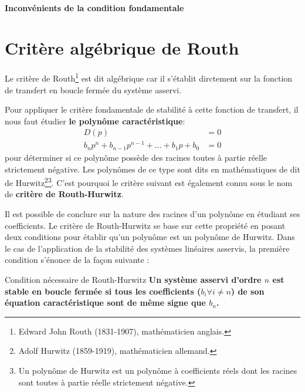 \paragraph{Inconvénients de la condition fondamentale}

\section{Critère algébrique de Routh}

Le critère de Routh\footnote{Edward John Routh (1831-1907), mathématicien anglais.}
est dit algébrique car il s'établit dirctement sur la fonction de transfert en 
boucle fermée du système asservi. 

Pour appliquer le critère fondamentale de stabilité à cette fonction de transfert,
il nous faut étudier \textbf{le polynôme caractéristique}:
\begin{align}
    D(p)&=0 \nonumber\\
    b_np^n+b_{n-1}p^{n-1}+\ldots+b_1p+b_0 &= 0
\end{align}
pour déterminer si ce polynôme possède des racines toutes à partie réelle 
strictement négative. Les polynômes de ce type sont dits en mathématiques 
de dit de Hurwitz\footnote{Adolf Hurwitz (1859-1919), mathématicien allemand.}\footnote{Un polynôme de 
Hurwitz est un polynôme à coefficients 
réels dont les racines sont toutes à partie réelle strictement négative.}.
C'est pourquoi le critère suivant est également connu sous le nom de \textbf{critère de Routh-Hurwitz}.

Il est possible de conclure sur la nature des racines d'un polynôme 
en étudiant ses coefficients. Le critère de Routh-Hurwitz se base sur cette propriété en 
posant deux conditions pour établir qu'un polynôme est un polynôme de Hurwitz.
Dans le cas de l'application de la stabilité des systèmes linéaires asservis, la première condition s'énonce 
de la façon suivante :
\begin{criteria}{Condition nécessaire de Routh-Hurwitz }
    \textbf{Un système asservi d'ordre $n$ est stable en boucle fermée 
    si tous les coefficients ($b_i\forall i\neq n$) de son équation caractéristique 
    sont de même signe que $b_n$.}
\end{criteria}


